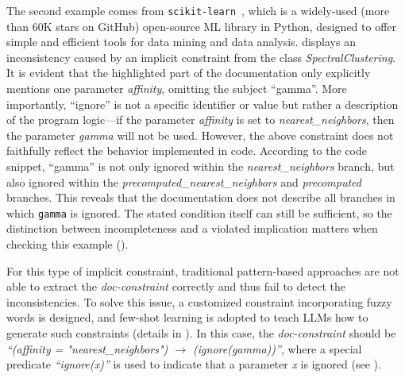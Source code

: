The second example comes from \texttt{scikit-learn}~\cite{github:scikit}, which is a widely-used
(more than 60K stars on GitHub) open-source ML library in Python, designed to offer simple
and efficient tools for data mining and data analysis.
 displays an inconsistency caused by an implicit constraint from the class
\textit{SpectralClustering}.
It is evident that the highlighted part of the documentation only explicitly mentions one parameter
\textit{affinity}, omitting the subject ``gamma''.
More importantly, ``ignore'' is not a specific identifier or value but rather a description of
the program logic---if the parameter \textit{affinity} is set to \textit{nearest\_neighbors}, then
the parameter \textit{gamma} will not be used.
However, the above constraint does not faithfully reflect the behavior implemented in code.
According to the code snippet, ``gamma'' is not only ignored within the \textit{nearest\_neighbors}
branch, but also ignored within the \textit{precomputed\_nearest\_neighbors} and
\textit{precomputed} branches.
This reveals that the documentation does not describe all branches in which \texttt{gamma} is ignored. The stated condition itself can still be sufficient, so the distinction between incompleteness and a violated implication matters when checking this example ().

For this type of implicit constraint, traditional pattern-based approaches are not able to extract
the \emph{doc-constraint} correctly and thus fail to detect the inconsistencies.
To solve this issue, a customized constraint incorporating fuzzy words is designed, and few-shot learning is adopted to teach LLMs how to generate such constraints (details in
).
In this case, the \emph{doc-constraint} should be \textit{``(affinity = "nearest\_neighbors") $\rightarrow$
(ignore(gamma))''}, where a special predicate \textit{``ignore(x)''} is used to indicate that a parameter
\textit{x} is ignored (see ).



